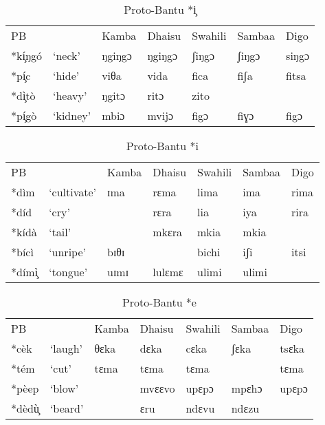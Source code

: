 \documentclass[output=paper,colorlinks,citecolor=brown]{langscibook}
\begin{document}
\begin{table}
    \caption{Proto-Bantu *i̧}
    \label{tab:ngonyani:6}
    \begin{tabular}{@{}p{1cm} p{1.3cm} p{1.3cm} p{1.3cm} p{1.3cm} p{1.3cm} p{1.3cm}@{}}
        PB & & Kamba & Dhaisu & Swahili & Sambaa & Digo \\
        *kí̧ŋgó & `neck' & ŋgiŋgɔ & ŋgiŋgɔ  & ʃiŋgɔ & ʃiŋgɔ & siŋgɔ\\
        *pí̧c & `hide' & viθa & vida & fica & fiʃa & fitsa\\
        *dì̧tò & `heavy' & ŋgitɔ & ritɔ & zito &  & \\
        *pí̧gò & `kidney' & mbiɔ & mvijɔ & figɔ & fiɣɔ & figɔ\\
    \end{tabular}
\end{table}

\begin{table}
    \caption{Proto-Bantu *i}
    \label{tab:ngonyani:7}
    \begin{tabular}{@{}p{1cm} p{1.3cm} p{1.3cm} p{1.3cm} p{1.3cm} p{1.3cm} p{1.3cm} @{}}
        PB & & Kamba & Dhaisu & Swahili & Sambaa & Digo \\
        *dìm & `cultivate' & ɪma & rɛma  & lima & ima & rima\\ 
        *díd & `cry' &  & rɛra & lia & iya & rira\\
        *kídà & `tail' & & mkɛra & mkia & mkia & \\
        *bícì & `unripe' & bɪθɪ & & bichi & iʃi & itsi \\
        *dímì̧     & `tongue' & uɪmɪ & lulɛmɛ & ulimi & ulimi & \\
    \end{tabular}
\end{table}

\begin{table}
    \caption{Proto-Bantu *e}
    \label{tab:ngonyani:8}
    \begin{tabular}{@{}p{1cm} p{1.3cm} p{1.3cm} p{1.3cm} p{1.3cm} p{1.3cm} p{1.3cm}@{}}
        PB & & Kamba & Dhaisu & Swahili & Sambaa & Digo \\
        *cèk & `laugh' & θɛka & dɛka  & cɛka &  ʃɛka & tsɛka \\
        *tém & `cut' & tɛma & tɛma & tɛma & & tɛma\\
        *pèep & `blow' &  & mvɛɛvo & upɛpɔ & mpɛhɔ & upɛpɔ \\
        *dèdù̧ & `beard' &  & ɛru & ndɛvu & ndɛzu & \\
    \end{tabular}
\end{table}
\end{document}
